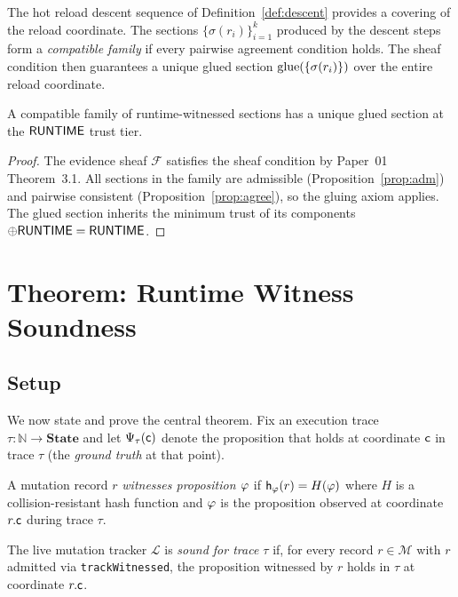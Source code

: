 \documentclass[11pt]{article}
\newcommand{\LiveTrack}{\mathcal{L}}             %
\newcommand{\LocSec}{\sigma}                     %
\newcommand{\PropHash}{\mathsf{h}_\varphi}       %
\newcommand{\MutLog}{\mathcal{M}}                %
\begin{document}
The hot reload descent sequence of Definition~\ref{def:descent}
provides a covering of the reload coordinate.  The sections
$\{\LocSec(r_i)\}_{i=1}^k$ produced by the descent steps form a
\emph{compatible family} if every pairwise agreement condition holds.
The sheaf condition then guarantees a unique glued section
$\glue(\{\LocSec(r_i)\})$ over the entire reload coordinate.

\begin{proposition}
\label{prop:gluing}
A compatible family of runtime-witnessed sections has a unique glued
section at the $\mathsf{RUNTIME}$ trust tier.
\end{proposition}
\begin{proof}
The evidence sheaf $\mathcal{F}$ satisfies the sheaf condition by
Paper~01 Theorem~3.1.  All sections in the family are admissible
(Proposition~\ref{prop:adm}) and pairwise consistent
(Proposition~\ref{prop:agree}), so the gluing axiom applies.  The
glued section inherits the minimum trust of its components
$\oplus \mathsf{RUNTIME} = \mathsf{RUNTIME}$.
\end{proof}

\section{Theorem: Runtime Witness Soundness}
\label{sec:theorem}

\subsection{Setup}
\label{subsec:thm-setup}

We now state and prove the central theorem.  Fix an execution trace
$\tau : \mathbb{N} \to \mathbf{State}$ and let $\Psi_\tau(\mathsf{c})$
denote the proposition that holds at coordinate $\mathsf{c}$ in trace
$\tau$ (the \emph{ground truth} at that point).

\begin{definition}
\label{def:witnessed}
A mutation record $r$ \emph{witnesses proposition $\varphi$} if
$\PropHash(r) = H(\prop)$ where $H$ is a collision-resistant hash
function and $\varphi$ is the proposition observed at coordinate
$r.\mathsf{c}$ during trace $\tau$.
\end{definition}

\begin{definition}
\label{def:soundness}
The live mutation tracker $\LiveTrack$ is \emph{sound for trace
$\tau$} if, for every record $r \in \MutLog$ with $r$ admitted via
\texttt{trackWitnessed}, the proposition witnessed by $r$ holds in
$\tau$ at coordinate $r.\mathsf{c}$.
\end{definition}
\end{document}
